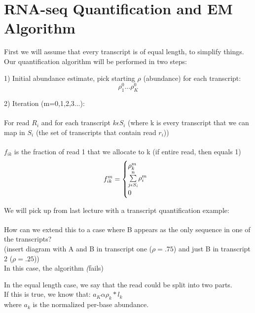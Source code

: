 \documentclass{article}
\begin{document}
\section{RNA-seq Quantification and EM Algorithm}

First we will assume that every transcript is of equal length, to simplify things. Our quantification algorithm will be performed in two steps: \newline

1) Initial abundance estimate, pick starting $\rho$ (abundance) for each transcript:
  \[\rho_1^0 ... \rho_K^0 \]

2) Iteration (m=0,1,2,3...): \\ \\
  For read $R_i$ and for each transcript $k  \epsilon  S_i$
  (where k is every transcript that we can map in $S_i$ (the set of transcripts that contain read $r_i$)) \\ \\
$f_{ik}$ is the fraction of read 1 that we allocate to k (if entire read, then equals 1)
%
\begin{equation}
\  f_{ik}^m =
  \begin{cases}
    \rho_k^m \\
    $$\sum\limits_{j \epsilon S_i}^{n}$$ \rho_i^m \\
    0
  \end{cases}
  \end{equation}



We will pick up from last lecture with a transcript quantification example: \\
\\
How can we extend this to a case where B appears as the only sequence in one of the transcripts?
\\

(insert diagram with A and B in transcript one ($\rho=.75$) and just B in transcript 2 ($\rho = .25$))
\\

In this case, the algorithm \textit(fails)

In the equal length case, we say that the read could be split into two parts. \\ If this is true, we know that:
$a_K \alpha \rho_k * l_k$ \\ where $a_k$ is the  normalized per-base abundance.


\end{document}
